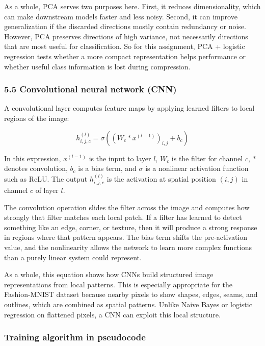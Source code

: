 \documentclass[11pt]{article}
\begin{document}
As a whole, PCA serves two purposes here. First, it reduces
dimensionality, which can make downstream models faster and less noisy.
Second, it can improve generalization if the discarded directions mostly
contain redundancy or noise. However, PCA preserves directions of high
variance, not necessarily directions that are most useful for
classification. So for this assignment, PCA + logistic regression tests
whether a more compact representation helps performance or whether
useful class information is lost during compression.

\subsubsection{5.5 Convolutional neural network
(CNN)}\label{convolutional-neural-network-cnn}

A convolutional layer computes feature maps by applying learned filters
to local regions of the image:

\[
h^{(l)}_{i,j,c} = \sigma\left((W_c * x^{(l-1)})_{i,j} + b_c\right)
\]

In this expression, \(x^{(l-1)}\) is the input to layer \(l\), \(W_c\)
is the filter for channel \(c\), \(*\) denotes convolution, \(b_c\) is a
bias term, and \(\sigma\) is a nonlinear activation function such as
ReLU. The output \(h^{(l)}_{i,j,c}\) is the activation at spatial
position \((i,j)\) in channel \(c\) of layer \(l\).

The convolution operation slides the filter across the image and
computes how strongly that filter matches each local patch. If a filter
has learned to detect something like an edge, corner, or texture, then
it will produce a strong response in regions where that pattern appears.
The bias term shifts the pre-activation value, and the nonlinearity
allows the network to learn more complex functions than a purely linear
system could represent.

As a whole, this equation shows how CNNs build structured image
representations from local patterns. This is especially appropriate for
the Fashion-MNIST dataset because nearby pixels to show shapes, edges,
seams, and outlines, which are combined as spatial patterns. Unlike
Naive Bayes or logistic regression on flattened pixels, a CNN can
exploit this local structure.

\subsubsection{Training algorithm in
pseudocode}\label{training-algorithm-in-pseudocode}
\end{document}

